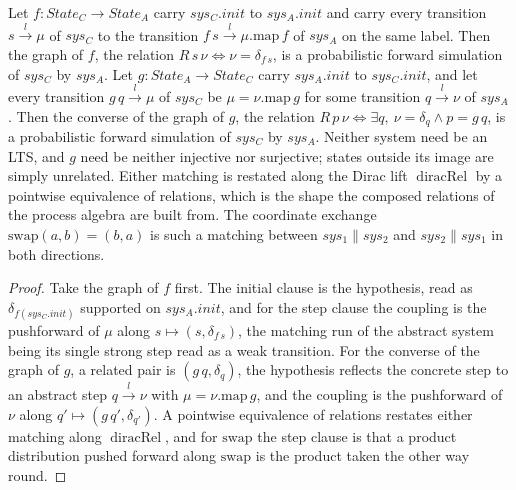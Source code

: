 \begin{lemma}
  \label{def:strongfunctional}
  \leanok
  Let $f : State_C \to State_A$ carry $sys_C.init$ to $sys_A.init$ and carry every transition $s \xrightarrow{l} \mu$ of $sys_C$ to the transition $f\,s \xrightarrow{l} \mu.\mathrm{map}\,f$ of $sys_A$ on the same label.
  Then the graph of $f$, the relation $R\,s\,\nu \iff \nu = \delta_{f\,s}$, is a probabilistic forward simulation of $sys_C$ by $sys_A$.
  Let $g : State_A \to State_C$ carry $sys_A.init$ to $sys_C.init$, and let every transition $g\,q \xrightarrow{l} \mu$ of $sys_C$ be $\mu = \nu.\mathrm{map}\,g$ for some transition $q \xrightarrow{l} \nu$ of $sys_A$.
  Then the converse of the graph of $g$, the relation $R\,p\,\nu \iff \exists q,\ \nu = \delta_q \wedge p = g\,q$, is a probabilistic forward simulation of $sys_C$ by $sys_A$.
  Neither system need be an LTS, and $g$ need be neither injective nor surjective; states outside its image are simply unrelated.
  Either matching is restated along the Dirac lift $\operatorname{diracRel}$ by a pointwise equivalence of relations, which is the shape the composed relations of the process algebra are built from.
  The coordinate exchange $\mathrm{swap}(a,b) = (b,a)$ is such a matching between $sys_1 \parallel sys_2$ and $sys_2 \parallel sys_1$ in both directions.
\end{lemma}

\begin{proof}\leanok
  Take the graph of $f$ first.
  The initial clause is the hypothesis, read as $\delta_{f(sys_C.init)}$ supported on $sys_A.init$, and for the step clause the coupling is the pushforward of $\mu$ along $s \mapsto (s, \delta_{f\,s})$, the matching run of the abstract system being its single strong step read as a weak transition.
  For the converse of the graph of $g$, a related pair is $(g\,q, \delta_q)$, the hypothesis reflects the concrete step to an abstract step $q \xrightarrow{l} \nu$ with $\mu = \nu.\mathrm{map}\,g$, and the coupling is the pushforward of $\nu$ along $q' \mapsto (g\,q', \delta_{q'})$.
  A pointwise equivalence of relations restates either matching along $\operatorname{diracRel}$, and for $\mathrm{swap}$ the step clause is that a product distribution pushed forward along $\mathrm{swap}$ is the product taken the other way round.
\end{proof}
